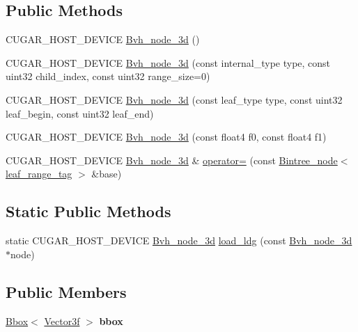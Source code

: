 \subsection*{Public Methods}
\begin{DoxyCompactItemize}
\item 
C\+U\+G\+A\+R\+\_\+\+H\+O\+S\+T\+\_\+\+D\+E\+V\+I\+CE \hyperlink{structcugar_1_1_bvh__node__3d_a6ff41f6cb0ee5bead35d7eedbb202407}{Bvh\+\_\+node\+\_\+3d} ()
\item 
C\+U\+G\+A\+R\+\_\+\+H\+O\+S\+T\+\_\+\+D\+E\+V\+I\+CE \hyperlink{structcugar_1_1_bvh__node__3d_a9f09a6205af9453255216eab7995472d}{Bvh\+\_\+node\+\_\+3d} (const internal\+\_\+type type, const uint32 child\+\_\+index, const uint32 range\+\_\+size=0)
\item 
C\+U\+G\+A\+R\+\_\+\+H\+O\+S\+T\+\_\+\+D\+E\+V\+I\+CE \hyperlink{structcugar_1_1_bvh__node__3d_a7e01f1b0d48cfa6930e8dc6dc66e1f29}{Bvh\+\_\+node\+\_\+3d} (const leaf\+\_\+type type, const uint32 leaf\+\_\+begin, const uint32 leaf\+\_\+end)
\item 
C\+U\+G\+A\+R\+\_\+\+H\+O\+S\+T\+\_\+\+D\+E\+V\+I\+CE \hyperlink{structcugar_1_1_bvh__node__3d_ae6b8f30f63aed22b76ec523f12380f59}{Bvh\+\_\+node\+\_\+3d} (const float4 f0, const float4 f1)
\item 
C\+U\+G\+A\+R\+\_\+\+H\+O\+S\+T\+\_\+\+D\+E\+V\+I\+CE \hyperlink{structcugar_1_1_bvh__node__3d}{Bvh\+\_\+node\+\_\+3d} \& \hyperlink{structcugar_1_1_bvh__node__3d_a23550a54c38a821438d5e7f34f863c21}{operator=} (const \hyperlink{structcugar_1_1_bintree__node}{Bintree\+\_\+node}$<$ \hyperlink{structcugar_1_1leaf__range__tag}{leaf\+\_\+range\+\_\+tag} $>$ \&base)
\end{DoxyCompactItemize}
\subsection*{Static Public Methods}
\begin{DoxyCompactItemize}
\item 
static C\+U\+G\+A\+R\+\_\+\+H\+O\+S\+T\+\_\+\+D\+E\+V\+I\+CE \hyperlink{structcugar_1_1_bvh__node__3d}{Bvh\+\_\+node\+\_\+3d} \hyperlink{structcugar_1_1_bvh__node__3d_a765171d7b76108e44d2ec4ff9684741c}{load\+\_\+ldg} (const \hyperlink{structcugar_1_1_bvh__node__3d}{Bvh\+\_\+node\+\_\+3d} $\ast$node)
\end{DoxyCompactItemize}
\subsection*{Public Members}
\begin{DoxyCompactItemize}
\item 
\mbox{\label{structcugar_1_1_bvh__node__3d_a4199cd920cc01d348e2f576c92d41773}} 
\hyperlink{structcugar_1_1_bbox}{Bbox}$<$ \hyperlink{structcugar_1_1_vector}{Vector3f} $>$ {\bfseries bbox}
\end{DoxyCompactItemize}


